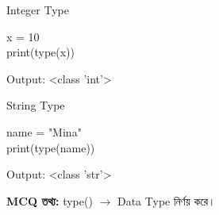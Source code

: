 \noindent
\begin{minipage}[t]{0.49\linewidth}

\begin{examplebox}{Integer Type}

\begin{codebox}
\begin{english}
\ttfamily
x = 10\\
print(type(x))
\end{english}
\end{codebox}

Output:
\textenglish{\ttfamily \textless class 'int'\textgreater}

\end{examplebox}

\end{minipage}
\hfill
\begin{minipage}[t]{0.49\linewidth}

\begin{examplebox}{String Type}

\begin{codebox}
\begin{english}
\ttfamily
name = "Mina"\\
print(type(name))
\end{english}
\end{codebox}

Output:
\textenglish{\ttfamily \textless class 'str'\textgreater}

\end{examplebox}

\end{minipage}

\begin{rememberbox}
\textbf{\color{deepOrange}MCQ তথ্য:}
\quad
\textenglish{\ttfamily type()}
\(\longrightarrow\)
Data Type নির্ণয় করে।
\end{rememberbox}




